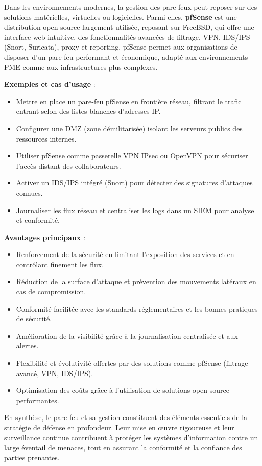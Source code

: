 Dans les environnements modernes, la gestion des pare-feux peut reposer sur des solutions matérielles, virtuelles ou logicielles. Parmi elles, \textbf{pfSense} est une distribution open source largement utilisée, reposant sur FreeBSD, qui offre une interface web intuitive, des fonctionnalités avancées de filtrage, VPN, IDS/IPS (Snort, Suricata), proxy et reporting. pfSense permet aux organisations de disposer d’un pare-feu performant et économique, adapté aux environnements PME comme aux infrastructures plus complexes.

\textbf{Exemples et cas d’usage} :
\begin{itemize}
	\item Mettre en place un pare-feu pfSense en frontière réseau, filtrant le trafic entrant selon des listes blanches d’adresses IP.
	\item Configurer une DMZ (zone démilitarisée) isolant les serveurs publics des ressources internes.
	\item Utiliser pfSense comme passerelle VPN IPsec ou OpenVPN pour sécuriser l’accès distant des collaborateurs.
	\item Activer un IDS/IPS intégré (Snort) pour détecter des signatures d’attaques connues.
	\item Journaliser les flux réseau et centraliser les logs dans un SIEM pour analyse et conformité.
\end{itemize}

\textbf{Avantages principaux} :
\begin{itemize}
	\item Renforcement de la sécurité en limitant l’exposition des services et en contrôlant finement les flux.
	\item Réduction de la surface d’attaque et prévention des mouvements latéraux en cas de compromission.
	\item Conformité facilitée avec les standards réglementaires et les bonnes pratiques de sécurité.
	\item Amélioration de la visibilité grâce à la journalisation centralisée et aux alertes.
	\item Flexibilité et évolutivité offertes par des solutions comme pfSense (filtrage avancé, VPN, IDS/IPS).
	\item Optimisation des coûts grâce à l’utilisation de solutions open source performantes.
\end{itemize}

En synthèse, le pare-feu et sa gestion constituent des éléments essentiels de la stratégie de défense en profondeur. Leur mise en œuvre rigoureuse et leur surveillance continue contribuent à protéger les systèmes d’information contre un large éventail de menaces, tout en assurant la conformité et la confiance des parties prenantes.

